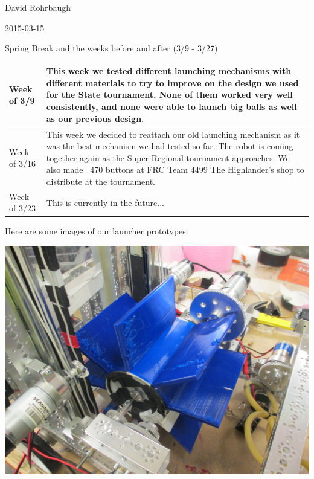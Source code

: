 David Rohrbaugh

2015-03-15

Spring Break and the weeks before and after (3/9 - 3/27)

\begin{tabular}{|p{5cm}|p{5cm}|}
 \hline
 Week of 3/9&
 This week we tested different launching mechanisms with different materials to try to improve on the design we used for the State tournament. None of them worked very well consistently, and none were able to launch big balls as well as our previous design.\\
\hline
 Week of 3/16&
 This week we decided to reattach our old launching mechanism as it was the best mechanism we had tested so far. The robot is coming together again as the Super-Regional tournament approaches. We also made ~470 buttons at FRC Team 4499 The Highlander's shop to distribute at the tournament.\\
\hline
 Week of 3/23&
 This is currently in the future...\\
 \hline
\end{tabular}

\medskip

Here are some images of our launcher prototypes:

\begin{center}
 \includegraphics[width=\textwidth]{./Entries/Images/launchProto7.JPG}
\end{center}


